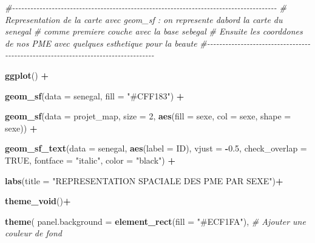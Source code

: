 \documentclass[
]{article}
\newenvironment{Shaded}{\begin{snugshade}}{\end{snugshade}}
\newcommand{\AttributeTok}[1]{\textcolor[rgb]{0.13,0.29,0.53}{#1}}
\newcommand{\CommentTok}[1]{\textcolor[rgb]{0.56,0.35,0.01}{\textit{#1}}}
\newcommand{\ConstantTok}[1]{\textcolor[rgb]{0.56,0.35,0.01}{#1}}
\newcommand{\DecValTok}[1]{\textcolor[rgb]{0.00,0.00,0.81}{#1}}
\newcommand{\FloatTok}[1]{\textcolor[rgb]{0.00,0.00,0.81}{#1}}
\newcommand{\FunctionTok}[1]{\textcolor[rgb]{0.13,0.29,0.53}{\textbf{#1}}}
\newcommand{\NormalTok}[1]{#1}
\newcommand{\SpecialCharTok}[1]{\textcolor[rgb]{0.81,0.36,0.00}{\textbf{#1}}}
\newcommand{\StringTok}[1]{\textcolor[rgb]{0.31,0.60,0.02}{#1}}
\begin{document}
\begin{Shaded}
\begin{Highlighting}[]
\CommentTok{\#{-}{-}{-}{-}{-}{-}{-}{-}{-}{-}{-}{-}{-}{-}{-}{-}{-}{-}{-}{-}{-}{-}{-}{-}{-}{-}{-}{-}{-}{-}{-}{-}{-}{-}{-}{-}{-}{-}{-}{-}{-}{-}{-}{-}{-}{-}{-}{-}{-}{-}{-}{-}{-}{-}{-}{-}{-}{-}{-}{-}{-}{-}{-}{-}{-}{-}{-}{-}{-}{-}{-}{-}{-}{-}{-}{-}{-}{-}{-}{-}{-}{-}{-}{-}{-}{-}{-}}
\CommentTok{\#  Representation de la carte avec geom\_sf : on represente d\textquotesingle{}abord la carte du senegal }
\CommentTok{\#      comme premiere couche avec la base sebegal}
\CommentTok{\#        Ensuite les coorddones de nos PME avec quelques esthetique pour la beaute}
\CommentTok{\#{-}{-}{-}{-}{-}{-}{-}{-}{-}{-}{-}{-}{-}{-}{-}{-}{-}{-}{-}{-}{-}{-}{-}{-}{-}{-}{-}{-}{-}{-}{-}{-}{-}{-}{-}{-}{-}{-}{-}{-}{-}{-}{-}{-}{-}{-}{-}{-}{-}{-}{-}{-}{-}{-}{-}{-}{-}{-}{-}{-}{-}{-}{-}{-}{-}{-}{-}{-}{-}{-}{-}{-}{-}{-}{-}{-}{-}{-}{-}{-}{-}{-}{-}}

\FunctionTok{ggplot}\NormalTok{() }\SpecialCharTok{+}
  
  \FunctionTok{geom\_sf}\NormalTok{(}\AttributeTok{data =}\NormalTok{ senegal, }\AttributeTok{fill =} \StringTok{"\#CFF183"}\NormalTok{) }\SpecialCharTok{+}
  
  \FunctionTok{geom\_sf}\NormalTok{(}\AttributeTok{data =}\NormalTok{ projet\_map, }\AttributeTok{size =} \DecValTok{2}\NormalTok{, }\FunctionTok{aes}\NormalTok{(}\AttributeTok{fill =}\NormalTok{ sexe, }\AttributeTok{col =}\NormalTok{ sexe, }\AttributeTok{shape =}\NormalTok{ sexe)) }\SpecialCharTok{+}
  
  \FunctionTok{geom\_sf\_text}\NormalTok{(}\AttributeTok{data =}\NormalTok{ senegal, }\FunctionTok{aes}\NormalTok{(}\AttributeTok{label =}\NormalTok{ ID), }\AttributeTok{vjust =} \SpecialCharTok{{-}}\FloatTok{0.5}\NormalTok{, }
               \AttributeTok{check\_overlap =} \ConstantTok{TRUE}\NormalTok{, }\AttributeTok{fontface =} \StringTok{"italic"}\NormalTok{, }\AttributeTok{color =} \StringTok{"black"}\NormalTok{) }\SpecialCharTok{+}
  
  \FunctionTok{labs}\NormalTok{(}\AttributeTok{title =} \StringTok{"REPRESENTATION SPACIALE DES PME PAR SEXE"}\NormalTok{)}\SpecialCharTok{+}
  
  \FunctionTok{theme\_void}\NormalTok{()}\SpecialCharTok{+}
  
   \FunctionTok{theme}\NormalTok{(}
    \AttributeTok{panel.background =} \FunctionTok{element\_rect}\NormalTok{(}\AttributeTok{fill =} \StringTok{"\#ECF1FA"}\NormalTok{), }
      \CommentTok{\# Ajouter une couleur de fond}
    

\end{Highlighting}
\end{Shaded}
\end{document}
